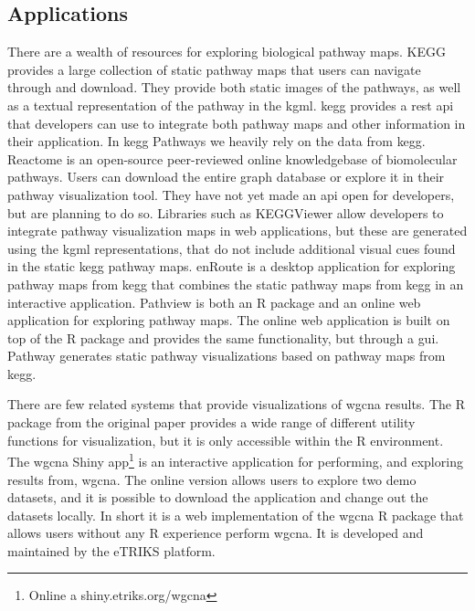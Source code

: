 \subsection{Applications} 
There are a wealth of resources for exploring biological pathway maps.
KEGG\cite{kegg} provides a large collection of static pathway maps that users
can navigate through and download. They provide both static images of the
pathways, as well as a textual representation of the pathway in the \gls{kgml}.
\gls{kegg} provides a \gls{rest} \gls{api} that
developers can use to integrate both pathway maps and other information in their
application. In \gls{kegg} Pathways we heavily rely on the data from \gls{kegg}. 
Reactome is an open-source peer-reviewed online knowledgebase of biomolecular
pathways.\cite{fabregat2018reactome} Users can download the entire graph
database or explore it in their pathway visualization tool. They have not yet
made an \gls{api} open for developers, but are planning to do so. Libraries such as
KEGGViewer\cite{villaveces2014keggviewer} allow developers to integrate pathway
visualization maps in web applications, but these are generated using the
\gls{kgml} representations, that do not include additional visual cues found in
the static \gls{kegg} pathway maps.  enRoute\cite{partl2012enroute} is a desktop
application for exploring pathway maps from \gls{kegg} that combines the static
pathway maps from \gls{kegg} in an interactive application. Pathview is both an
R package and an online web application for exploring pathway
maps.\cite{luo2017pathview} The online web application is built on top of the R
package and provides the same functionality, but through a \gls{gui}. Pathway
generates static pathway visualizations based on pathway maps from \gls{kegg}. 

There are few related systems that provide visualizations of \gls{wgcna}
results. The R package from the original paper provides a wide range of
different utility functions for visualization, but it is only accessible within
the R environment.  The \gls{wgcna} Shiny app\footnote{Online a
shiny.etriks.org/wgcna} is an interactive application for performing, and
exploring results from, \gls{wgcna}.  The online version allows users to explore
two demo datasets, and it is possible to download the application and change out
the datasets locally. In short it is a web implementation of the \gls{wgcna} R
package that allows users without any R experience perform \gls{wgcna}. It is
developed and maintained by the eTRIKS platform.\cite{bussery2018etriks}

